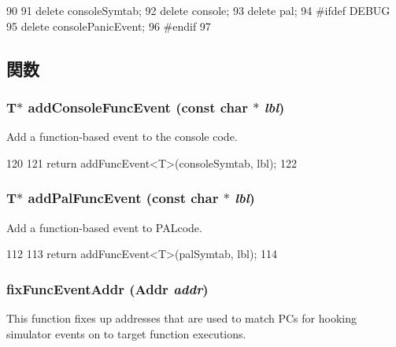 \begin{DoxyCode}
90 {
91     delete consoleSymtab;
92     delete console;
93     delete pal;
94 #ifdef DEBUG
95     delete consolePanicEvent;
96 #endif
97 }
\end{DoxyCode}


\subsection{関数}
\hypertarget{classAlphaSystem_a144f0e3cc56a01c7425853cc5ad44021}{
\subsubsection[{addConsoleFuncEvent}]{\setlength{\rightskip}{0pt plus 5cm}T$\ast$ addConsoleFuncEvent (const char $\ast$ {\em lbl})}}
\label{classAlphaSystem_a144f0e3cc56a01c7425853cc5ad44021}
Add a function-\/based event to the console code. 


\begin{DoxyCode}
120     {
121         return addFuncEvent<T>(consoleSymtab, lbl);
122     }
\end{DoxyCode}
\hypertarget{classAlphaSystem_aa8018ca1a248feeeefa3a4180d432490}{
\subsubsection[{addPalFuncEvent}]{\setlength{\rightskip}{0pt plus 5cm}T$\ast$ addPalFuncEvent (const char $\ast$ {\em lbl})}}
\label{classAlphaSystem_aa8018ca1a248feeeefa3a4180d432490}
Add a function-\/based event to PALcode. 


\begin{DoxyCode}
112     {
113         return addFuncEvent<T>(palSymtab, lbl);
114     }
\end{DoxyCode}
\hypertarget{classAlphaSystem_ac72b76fe05499c31c7091ec5a56c0d52}{
\subsubsection[{fixFuncEventAddr}]{ fixFuncEventAddr ({\bf Addr} {\em addr})}}
\label{classAlphaSystem_ac72b76fe05499c31c7091ec5a56c0d52}
This function fixes up addresses that are used to match PCs for hooking simulator events on to target function executions.


